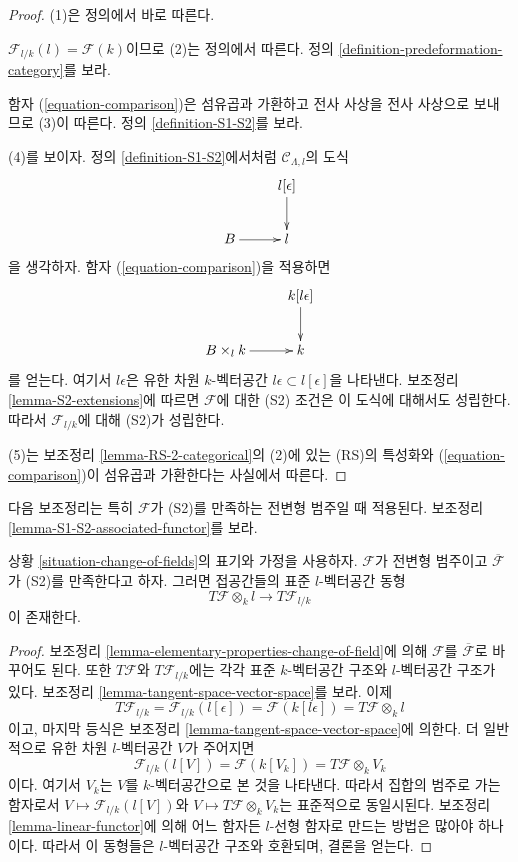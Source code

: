 \begin{proof}
(1)은 정의에서 바로 따른다.

\medskip\noindent
$\mathcal{F}_{l/k}(l) = \mathcal{F}(k)$이므로 (2)는 정의에서 따른다.
정의 \ref{definition-predeformation-category}를 보라.

\medskip\noindent
함자 (\ref{equation-comparison})은 섬유곱과 가환하고 전사 사상을
전사 사상으로 보내므로 (3)이 따른다. 정의 \ref{definition-S1-S2}를 보라.

\medskip\noindent
(4)를 보이자. 정의 \ref{definition-S1-S2}에서처럼
$\mathcal{C}_{\Lambda, l}$의 도식
$$
\xymatrix{
          & l[\epsilon] \ar[d] \\
B  \ar[r] & l
}
$$
을 생각하자. 함자 (\ref{equation-comparison})을 적용하면
$$
\xymatrix{
          & k[l\epsilon] \ar[d] \\
B \times_l k  \ar[r] & k
}
$$
를 얻는다. 여기서 $l\epsilon$은 유한 차원 $k$-벡터공간
$l\epsilon \subset l[\epsilon]$을 나타낸다. 보조정리
\ref{lemma-S2-extensions}에 따르면 $\mathcal{F}$에 대한 (S2) 조건은
이 도식에 대해서도 성립한다. 따라서 $\mathcal{F}_{l/k}$에 대해
(S2)가 성립한다.

\medskip\noindent
(5)는 보조정리 \ref{lemma-RS-2-categorical}의 (2)에 있는
(RS)의 특성화와 (\ref{equation-comparison})이 섬유곱과 가환한다는 사실에서
따른다.
\end{proof}

\noindent
다음 보조정리는 특히 $\mathcal{F}$가 (S2)를 만족하는 전변형 범주일 때
적용된다. 보조정리 \ref{lemma-S1-S2-associated-functor}를 보라.

\begin{lemma}
\label{lemma-tangent-space-change-of-field}
상황 \ref{situation-change-of-fields}의 표기와 가정을 사용하자.
$\mathcal{F}$가 전변형 범주이고 $\overline{\mathcal{F}}$가 (S2)를
만족한다고 하자. 그러면 접공간들의 표준 $l$-벡터공간 동형
$$
T\mathcal{F} \otimes_k l \longrightarrow T\mathcal{F}_{l/k}
$$
이 존재한다.
\end{lemma}

\begin{proof}
보조정리 \ref{lemma-elementary-properties-change-of-field}에 의해
$\mathcal{F}$를 $\overline{\mathcal{F}}$로 바꾸어도 된다. 또한
$T\mathcal{F}$와 $T\mathcal{F}_{l/k}$에는 각각 표준 $k$-벡터공간 구조와
$l$-벡터공간 구조가 있다. 보조정리
\ref{lemma-tangent-space-vector-space}를 보라. 이제
$$
T\mathcal{F}_{l/k} = \mathcal{F}_{l/k}(l[\epsilon])
= \mathcal{F}(k[l\epsilon]) = T\mathcal{F} \otimes_k l
$$
이고, 마지막 등식은 보조정리 \ref{lemma-tangent-space-vector-space}에 의한다.
더 일반적으로 유한 차원 $l$-벡터공간 $V$가 주어지면
$$
\mathcal{F}_{l/k}(l[V]) = \mathcal{F}(k[V_k]) = T\mathcal{F} \otimes_k V_k
$$
이다. 여기서 $V_k$는 $V$를 $k$-벡터공간으로 본 것을 나타낸다.
따라서 집합의 범주로 가는 함자로서
$V \mapsto \mathcal{F}_{l/k}(l[V])$와
$V \mapsto T\mathcal{F} \otimes_k V_k$는 표준적으로 동일시된다.
보조정리 \ref{lemma-linear-functor}에 의해 어느 함자든 $l$-선형 함자로
만드는 방법은 많아야 하나이다. 따라서 이 동형들은 $l$-벡터공간 구조와
호환되며, 결론을 얻는다.
\end{proof}

